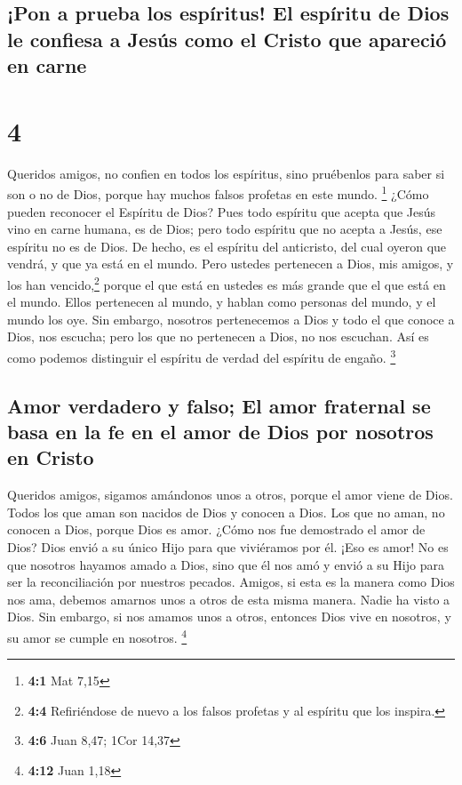 \hypertarget{pon-a-prueba-los-espuxedritus-el-espuxedritu-de-dios-le-confiesa-a-jesuxfas-como-el-cristo-que-apareciuxf3-en-carne}{%
\subsection{¡Pon a prueba los espíritus! El espíritu de Dios le confiesa
a Jesús como el Cristo que apareció en
carne}\label{pon-a-prueba-los-espuxedritus-el-espuxedritu-de-dios-le-confiesa-a-jesuxfas-como-el-cristo-que-apareciuxf3-en-carne}}

\hypertarget{section-3}{%
\section{4}\label{section-3}}

 Queridos amigos, no confien en todos los espíritus, sino
pruébenlos para saber si son o no de Dios, porque hay muchos falsos
profetas en este mundo. \footnote{\textbf{4:1} Mat 7,15} 
¿Cómo pueden reconocer el Espíritu de Dios? Pues todo espíritu que
acepta que Jesús vino en carne humana, es de Dios;  pero
todo espíritu que no acepta a Jesús, ese espíritu no es de Dios. De
hecho, es el espíritu del anticristo, del cual oyeron que vendrá, y que
ya está en el mundo.  Pero ustedes pertenecen a Dios, mis
amigos, y los han vencido,\footnote{\textbf{4:4} Refiriéndose de nuevo a
  los falsos profetas y al espíritu que los inspira.} porque el que está
en ustedes es más grande que el que está en el mundo. 
Ellos pertenecen al mundo, y hablan como personas del mundo, y el mundo
los oye.  Sin embargo, nosotros pertenecemos a Dios y todo
el que conoce a Dios, nos escucha; pero los que no pertenecen a Dios, no
nos escuchan. Así es como podemos distinguir el espíritu de verdad del
espíritu de engaño. \footnote{\textbf{4:6} Juan 8,47; 1Cor 14,37}

\hypertarget{amor-verdadero-y-falso-el-amor-fraternal-se-basa-en-la-fe-en-el-amor-de-dios-por-nosotros-en-cristo}{%
\subsection{Amor verdadero y falso; El amor fraternal se basa en la fe
en el amor de Dios por nosotros en
Cristo}\label{amor-verdadero-y-falso-el-amor-fraternal-se-basa-en-la-fe-en-el-amor-de-dios-por-nosotros-en-cristo}}

 Queridos amigos, sigamos amándonos unos a otros, porque
el amor viene de Dios. Todos los que aman son nacidos de Dios y conocen
a Dios.  Los que no aman, no conocen a Dios, porque Dios
es amor.  ¿Cómo nos fue demostrado el amor de Dios? Dios
envió a su único Hijo para que viviéramos por él.  ¡Eso
es amor! No es que nosotros hayamos amado a Dios, sino que él nos amó y
envió a su Hijo para ser la reconciliación por nuestros pecados.
 Amigos, si esta es la manera como Dios nos ama, debemos
amarnos unos a otros de esta misma manera.  Nadie ha
visto a Dios. Sin embargo, si nos amamos unos a otros, entonces Dios
vive en nosotros, y su amor se cumple en nosotros. \footnote{\textbf{4:12}
  Juan 1,18}


